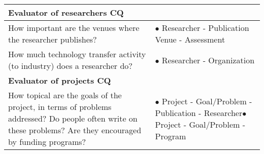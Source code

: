 \begin{table}[]
\begin{tabular}{|p{6cm}|p{6cm}|}
\\ \hline
\multicolumn{2}{|l|}{\textbf{Evaluator of researchers CQ}}                                                                        \\ \hline
How important are the venues where the researcher publishes?                                                                                         & $\bullet$ Researcher - Publication Venue - \newline Assessment                                                                                                    \\ \hline
How much technology transfer activity (to industry) does a researcher do?                                                                             & $\bullet$ Researcher - Organization                                                                                                                      \\ \hline
\multicolumn{2}{|l|}{\textbf{Evaluator of projects CQ}}                                                                \\ \hline
How topical are the goals of the project, in terms of problems addressed? Do people often write on these problems? Are they encouraged by funding programs?          &  $\bullet$ Project - Goal/Problem - Publication - \newline Researcher\newline                     $\bullet$ Project - Goal/Problem - Program                                        \\ \hline

\end{tabular}
\end{table}
